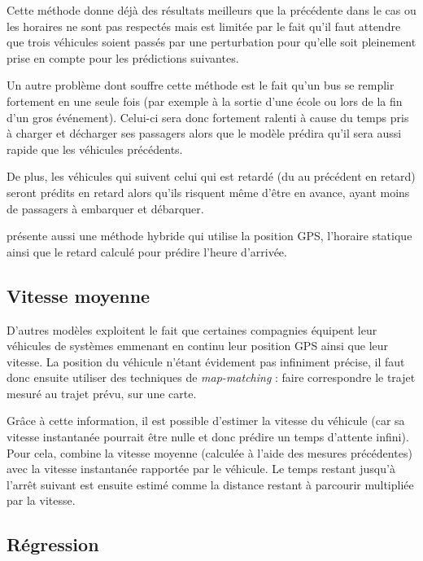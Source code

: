 \documentclass[letterpaper]{article}
\begin{document}
Cette méthode donne déjà des résultats meilleurs que la précédente dans le cas ou les horaires ne sont pas respectés mais est limitée par le fait qu'il faut attendre que trois véhicules soient passés par une perturbation pour qu'elle soit pleinement prise en compte pour les prédictions suivantes.

Un autre problème dont souffre cette méthode est le fait qu'un bus se remplir fortement en une seule fois (par exemple à la sortie d'une école ou lors de la fin d'un gros événement). Celui-ci sera donc fortement ralenti à cause du temps pris à charger et décharger ses passagers alors que le modèle prédira qu'il sera aussi rapide que les véhicules précédents.

De plus, les véhicules qui suivent celui qui est retardé (du au précédent en retard) seront prédits en retard alors qu'ils risquent même d'être en avance, ayant moins de passagers à embarquer et débarquer.

\cite{lin1999experimental} présente aussi une méthode hybride qui utilise la position GPS, l'horaire statique ainsi que le retard calculé pour prédire l'heure d'arrivée.



\subsection{Vitesse moyenne}

D'autres modèles exploitent le fait que certaines compagnies équipent leur véhicules de systèmes emmenant en continu leur position GPS ainsi que leur vitesse. La position du véhicule n'étant évidement pas infiniment précise, il faut donc ensuite utiliser des techniques de \textit{map-matching} : faire correspondre le trajet mesuré au trajet prévu, sur une carte.

Grâce à cette information, il est possible d'estimer la vitesse du véhicule (car sa vitesse instantanée pourrait être nulle et donc prédire un temps d'attente infini). Pour cela, \cite{Maciver2002} combine la vitesse moyenne (calculée à l'aide des mesures précédentes) avec la vitesse instantanée rapportée par le véhicule. Le temps restant jusqu'à l'arrêt suivant est ensuite estimé comme la distance restant à parcourir multipliée par la vitesse.

\subsection{Régression}
\end{document}
